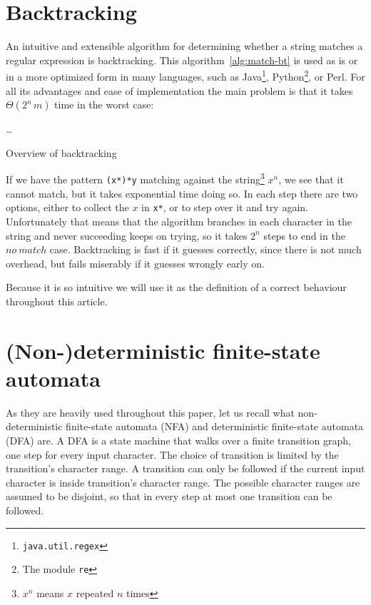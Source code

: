 \documentclass[11pt,a4paper,twoside,openright]{Thesis}
\theoremstyle{definition}
\newcommand{\seclabel}[1]{\label{sec:#1}}
\begin{document}
\section{Backtracking}\seclabel{backtracking}
An intuitive and extensible algorithm for determining whether a string
matches a regular expression is backtracking. This
algorithm~\ref{alg:match-bt} is used as is or in a more optimized form in
many languages, such as Java\footnote{\texttt{java.util.regex}},
Python\footnote{The module \texttt{re}}, or Perl\cite{Cox07a}. For all its
advantages and ease of implementation the main problem is that it takes
$\Theta(2^n\,m)$ time in the worst case:

\begin{algorithm*}
  \begin{algorithmic}
      \State {}
      \State {}
        \State {}
      \Else
        \State {}
      \EndIf
    \ElsIf{\dots}
      \State \dots
    \EndIf
  \EndFunction
  \end{algorithmic}
  \caption{\label{alg:match-bt}Overview of backtracking}
\end{algorithm*}

If we have the pattern \texttt{(x*)*y} matching against the
string\footnote{$x^n$ means $x$ repeated $n$ times} $x^n$, we see that it
cannot match, but it takes exponential time doing so. In each step there
are two options, either to collect the $x$ in \texttt{x*}, or to step over it
and try again. Unfortunately that means that the algorithm branches in each
character in the string and never succeeding keeps on trying, so it takes $2^n$
steps to end in the $no\ match$ case.  Backtracking is fast if it guesses
correctly, since there is not much overhead, but fails miserably if it guesses
wrongly early on.

Because it is so intuitive we will use it as the definition of a correct 
behaviour throughout this article.

\section{(Non-)deterministic finite-state automata}
As they are heavily used throughout this paper, let us recall what
non-deterministic finite-state automata (NFA) and deterministic finite-state
automata (DFA) are. A DFA is a state machine that walks over a finite
transition graph, one step for every input character. The choice of transition
is limited by the transition's character range. A transition can only be
followed if the current input character is inside transition's character
range. The possible character ranges are assumed to be disjoint, so that in
every step at most one transition can be followed.
\end{document}

